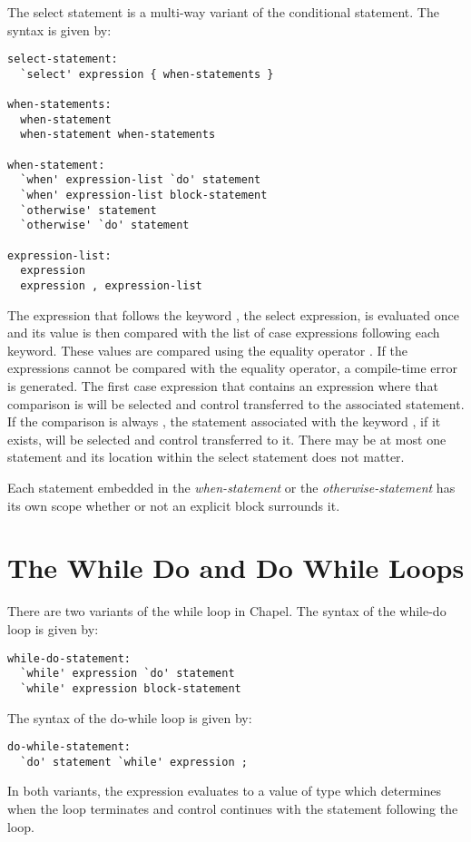 The select statement is a multi-way variant of the conditional
statement.  The syntax is given by:
\begin{syntax}
\begin{verbatim}
select-statement:
  `select' expression { when-statements }

when-statements:
  when-statement
  when-statement when-statements

when-statement:
  `when' expression-list `do' statement
  `when' expression-list block-statement
  `otherwise' statement
  `otherwise' `do' statement

expression-list:
  expression
  expression , expression-list
\end{verbatim}
\end{syntax}
The expression that follows the keyword , the select
expression, is evaluated once and its value is then compared
with the list of case expressions following each
 keyword. These values are compared using the equality
operator \chpl{==}.  If the expressions cannot be compared with the
equality operator, a compile-time error is generated.  The first case
expression that contains an expression where that comparison
is  will be selected and control transferred to the
associated statement.  If the comparison is always , the
statement associated with the keyword , if it exists,
will be selected and control transferred to it.  There may be at most
one  statement and its location within the select
statement does not matter.

Each statement embedded in the {\em when-statement} or the {\em otherwise-statement} has its own scope
whether or not an explicit block surrounds it.

\section{The While Do and Do While Loops}
\label{The_While_and_Do_While_Loops}

There are two variants of the while loop in Chapel.  The syntax of the
while-do loop is given by:
\begin{syntax}
\begin{verbatim}
while-do-statement:
  `while' expression `do' statement
  `while' expression block-statement
\end{verbatim}
\end{syntax}
The syntax of the do-while loop is given by:
\begin{syntax}
\begin{verbatim}
do-while-statement:
  `do' statement `while' expression ;
\end{verbatim}
\end{syntax}
In both variants, the expression evaluates to a value of type 
which determines when the loop terminates and control continues with
the statement following the loop.

